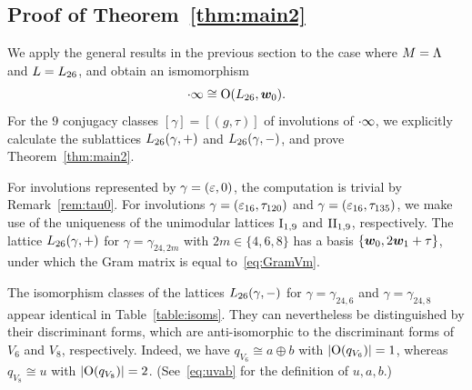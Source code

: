 \documentclass{amsart} %
\begin{document}
\subsection{Proof of Theorem~\ref{thm:main2}}\label{subsec:proofmain2}
%
We apply the general results in the previous section to the case where $M=\Lambda$ and $L=L_{26}$,
and obtain an ismomorphism 
\[
\cdot \infty\cong \mathord{\mathrm{O}}(L_{26}, \boldsymbol{w}_0).
\]
%
For the $9$ conjugacy classes 
$[\gamma]=[(g, \tau)]$ of involutions of $\cdot \infty$,
we explicitly calculate the sublattices $L_{26}(\gamma, +)$ and $L_{26}(\gamma, -)$, 
and prove Theorem~\ref{thm:main2}.
%
\begin{remark}
For involutions represented by $\gamma=(\varepsilon, 0)$,
the computation is trivial by Remark~\ref{rem:tau0}.
For involutions $\gamma=(\varepsilon_{16}, \tau_{120})$ and $\gamma=(\varepsilon_{16}, \tau_{135})$,
we make use of the uniqueness of the unimodular lattices $\mathrm{I}_{1, 9}$ and $\mathrm{II}_{1, 9}$,
respectively.
The lattice $L_{26}(\gamma,+)$ for $\gamma=\gamma_{24,2m}$
with $2m \in \{4,6,8\}$ has a basis $\{\boldsymbol{w}_0, 2\boldsymbol{w}_1+\tau\}$, 
under which the Gram matrix is equal to~\eqref{eq:GramVm}.
\end{remark}
%
%
%
%
%
\begin{remark}
The isomorphism classes of the lattices $L_{26}(\gamma,-)$ for $\gamma=\gamma_{24,6}$ 
and $\gamma=\gamma_{24,8}$ 
appear identical in Table~\ref{table:isoms}. 
They can nevertheless be distinguished by their discriminant forms, 
which are anti-isomorphic to the discriminant forms of $V_6$ and $V_8$, respectively. 
Indeed, we have $q_{V_6}\cong a\oplus b$ with $|\mathord{\mathrm{O}}(q_{V_6})|=1$, 
whereas $q_{V_8}\cong u$ with $|\mathord{\mathrm{O}}(q_{V_8})|=2$.
(See~\eqref{eq:uvab} for the definition of $u, a, b$.)
 \end{remark}
%
%
%
\end{document}
